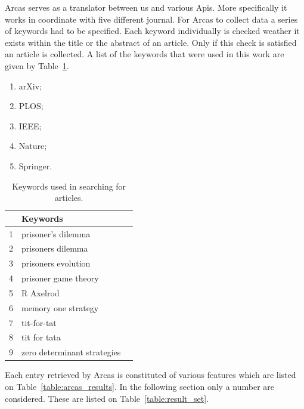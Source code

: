 \documentclass{article}
\begin{document}
Arcas serves as a translator between us and various Apis. More specifically it
works in coordinate with five different journal. For Arcas to collect data a series
of keywords had to be specified. Each keyword individually is checked weather
it exists within the title or the abstract of an article. Only if this check is
satisfied an article is collected. A list of the keywords that were used in this
work are given by Table~\ref{table:search_keywords}.

\begin{multicols}{3}
    \begin{enumerate}
        \item arXiv;
        \item PLOS;
        \item IEEE;
        \item Nature;
        \item Springer.
    \end{enumerate}
\end{multicols}

\begin{table}[!hbtp]
    \begin{center}
        \begin{tabular}{lll}
            \toprule
             & Keywords & \\
            \midrule
             1 &  prisoner's dilemma & \\
             2 &  prisoners dilemma  & \\
             3 &  prisoners evolution & \\
             4 &  prisoner game theory & \\
             5 &  R Axelrod & \\
             6 &  memory one strategy & \\
             7 & tit-for-tat & \\
             8 & tit for tata & \\
             9 & zero determinant strategies & \\
            \bottomrule
        \end{tabular}
    \end{center}
    \caption{Keywords used in searching for articles.}
    \label{table:search_keywords}
\end{table}

Each entry retrieved by Arcas is constituted of various features which are 
listed on Table~\ref{table:arcas_results}. In the following section only a number
are considered. These are listed on Table~\ref{table:result_set}.
\end{document}
